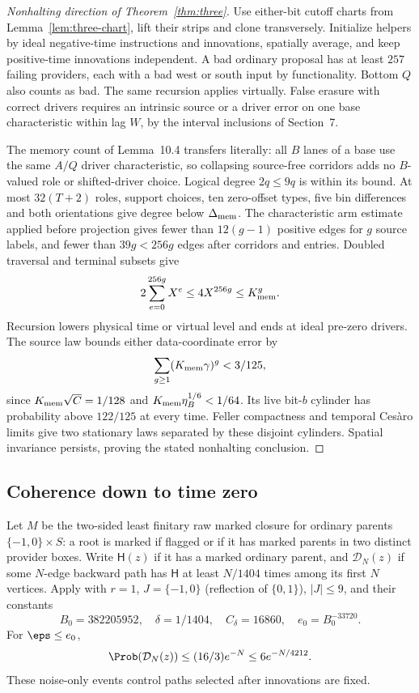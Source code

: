 \begin{proof}[Nonhalting direction of Theorem~\ref{thm:three}]
Use either-bit cutoff charts from Lemma~\ref{lem:three-chart}, lift their strips and clone transversely. Initialize helpers by ideal negative-time instructions and innovations, spatially average, and keep positive-time innovations independent. A bad ordinary proposal has at least $257$ failing providers, each with a bad west or south input by functionality. Bottom $Q$ also counts as bad. The same recursion applies virtually. False erasure with correct drivers requires an intrinsic source or a driver error on one base characteristic within lag $W$, by the interval inclusions of Section~7.

The memory count of Lemma~10.4 transfers literally: all $B$ lanes of a base use the same $A/Q$ driver characteristic, so collapsing source-free corridors adds no $B$-valued role or shifted-driver choice. Logical degree $2q\le9q$ is within its bound. At most $32(T+2)$ roles, support choices, ten zero-offset types, five bin differences and both orientations give degree below $\Delta_{\rm mem}$. The characteristic arm estimate applied before projection gives fewer than $12(g-1)$ positive edges for $g$ source labels, and fewer than $39g<256g$ edges after corridors and entries. Doubled traversal and terminal subsets give
\[
 2\sum_{e=0}^{256g}X^e\le4X^{256g}\le K_{\rm mem}^g.
\]
Recursion lowers physical time or virtual level and ends at ideal pre-zero drivers. The source law bounds either data-coordinate error by
\[
 \sum_{g\ge1}(K_{\rm mem}\gamma)^g<3/125,
\]
since $K_{\rm mem}\sqrt C=1/128$ and $K_{\rm mem}\eta_B^{1/6}<1/64$. Its live bit-$b$ cylinder has probability above $122/125$ at every time. Feller compactness and temporal Ces\`aro limits give two stationary laws separated by these disjoint cylinders. Spatial invariance persists, proving the stated nonhalting conclusion.
\end{proof}

\subsection{Coherence down to time zero}

Let $M$ be the two-sided least finitary raw marked closure for ordinary parents $\{-1,0\}\times S$: a root is marked if flagged or if it has marked parents in two distinct provider boxes. Write $\mathsf H(z)$ if it has a marked ordinary parent, and $\mathcal D_N(z)$ if some $N$-edge backward path has $\mathsf H$ at least $N/1404$ times among its first $N$ vertices. Apply \cite[Lemmas~12.3--12.4]{DMforgetLower} with $r=1$, $J=\{-1,0\}$ (reflection of $\{0,1\}$), $|J|\le9$, and their constants
\[
 B_0=382205952,\quad\delta=1/1404,\quad C_\delta=16860,
 \quad e_0=B_0^{-33720}.
\]
For $\eps\le e_0$,
\begin{equation}\label{eq:three-density}
 \Prob(\mathcal D_N(z))\le(16/3)e^{-N}\le6e^{-N/4212}.
\end{equation}
These noise-only events control paths selected after innovations are fixed.

